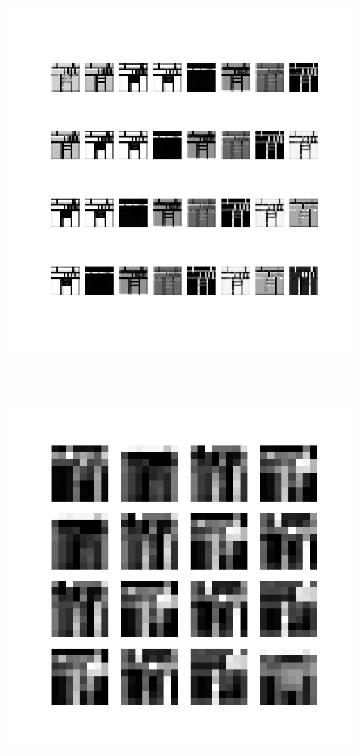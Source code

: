\begin{figure}
\begin{subfigure}[b]{0.4\linewidth}
        \includegraphics[width=\linewidth]{images/cae_online_lstm/caelstm_section_cae_training_house_10000_model_feature_maps_map_1_0_2.png}
    \end{subfigure}
    \\[-0.5cm]
    \begin{subfigure}[b]{0.4\linewidth}
        \includegraphics[width=\linewidth]{images/cae_online_lstm/caelstm_section_cae_training_house_10000_model_feature_maps_map_1_0_1.png}

\end{subfigure}
\end{figure}

